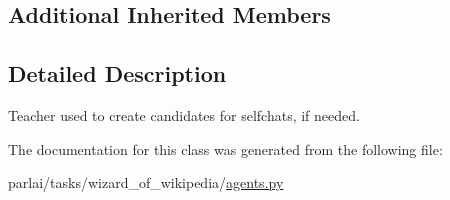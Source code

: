 \subsection*{Additional Inherited Members}


\subsection{Detailed Description}
\begin{DoxyVerb}Teacher used to create candidates for selfchats, if needed.
\end{DoxyVerb}
 

The documentation for this class was generated from the following file\+:\begin{DoxyCompactItemize}
\item 
parlai/tasks/wizard\+\_\+of\+\_\+wikipedia/\hyperlink{parlai_2tasks_2wizard__of__wikipedia_2agents_8py}{agents.\+py}\end{DoxyCompactItemize}
